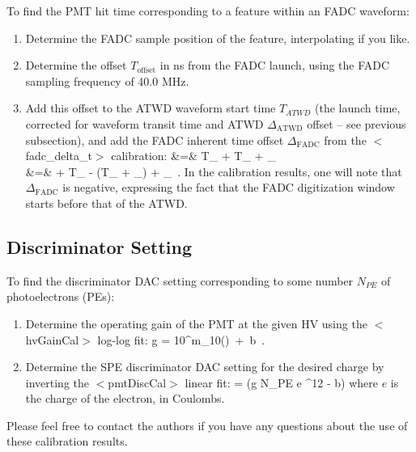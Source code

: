 \documentclass[10pt]{article}
\begin{document}
\noindent To find the PMT hit time corresponding to a feature within an FADC waveform:

\begin{enumerate}
\item{Determine the FADC sample position of the feature, interpolating if
  you like.}
\item{Determine the offset $T_{\mathrm{offset}}$ in ns from the FADC launch, using the FADC
  sampling frequency of 40.0 MHz.}
\item{Add this offset to the ATWD waveform start time $T_{ATWD}$ (the
  launch time, corrected for waveform transit time and ATWD $\Delta_{\mathrm{ATWD}}$ offset -- see previous
  subsection), and add the FADC inherent time offset $\Delta_{\mathrm{FADC}}$ from
  the $<$fadc\_delta\_t$>$ calibration:}
\bea
{} &=& T_{} + 
T_{} + \Delta_{}\ \nonumber\\
&=&  + T_{}
- (T_{} + \Delta_{}) +
\Delta_{}\ .
\eea
In the calibration results, one will note that $\Delta_{\mathrm{FADC}}$ is
negative, expressing the fact that the FADC 
digitization window starts before that of the ATWD.  
\end{enumerate}

\subsection{Discriminator Setting}

To find the discriminator DAC setting corresponding to some number $N_{PE}$
of photoelectrons (PEs):

\begin{enumerate}
\item{Determine the operating gain of the PMT at the given HV using the
  $<$hvGainCal$>$ log-log fit:}
\be
g = 10^{m\cdot\log_{10}()\ +\ b}\ .
\ee

\item{Determine the SPE discriminator DAC setting for the desired charge by
  inverting the $<$pmtDiscCal$>$ linear fit:}
\be
{} =  (g \cdot N_{PE} \cdot e ^{12} - b)
\ee
where $e$ is the charge of the electron, in Coulombs.
\end{enumerate}

Please feel free to contact the authors if you have any questions about the
use of these calibration results.  
\end{document}
